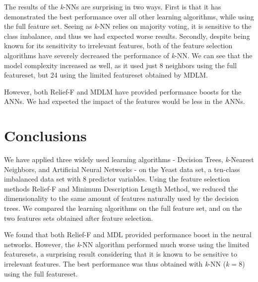 \documentclass{article}
\begin{document}
The results of the \textit{k}-NNs are surprising in two ways. First is that it has demonstrated the best performance over all other learning algorithms, while using the full feature set. Seeing as \textit{k}-NN relies on majority voting, it is sensitive to the class imbalance, and thus we had expected worse results.
Secondly, despite being known for its sensitivity to irrelevant features, both of the feature selection algorithms have severely decreased the performance of \textit{k}-NN. We can see that the model complexity increased as well, as it used just 8 neighbors using the full featureset, but 24 using the limited featureset obtained by MDLM.

However, both Relief-F and MDLM have provided performance boosts for the ANNs. We had expected the impact of the features would be less in the ANNs.

\section{Conclusions}
We have applied three widely used learning algorithms - Decision Trees, \textit{k}-Nearest Neighbors, and Artificial Neural Networks - on the Yeast data set, a ten-class imbalanced data set with 8 predictor variables. Using the feature selection methods Relief-F and Minimum Description Length Method, we reduced the dimensionality to the same amount of features naturally used by the decision trees.  We compared the learning algorithms on the full feature set, and on the two features sets obtained after feature selection.

We found that both Relief-F and MDL provided performance boost in the neural networks. However, the \textit{k}-NN algorithm performed much worse using the limited featuresets, a surprising result considering that it is known to be sensitive to irrelevant features. The best performance was thus obtained with \textit{k}-NN ($k=8$) using the full featureset.




{}

\end{document}
